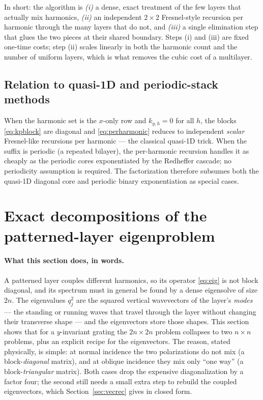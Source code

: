 \documentclass[11pt]{article}
\theoremstyle{remark}
\begin{document}
In short: the algorithm is \emph{(i)} a dense, exact treatment of the few
layers that actually mix harmonics, \emph{(ii)} an independent $2\times2$
Fresnel-style recursion per harmonic through the many layers that do not, and
\emph{(iii)} a single elimination step that glues the two pieces at their
shared boundary.  Steps (i) and (iii) are fixed one-time costs; step (ii)
scales linearly in both the harmonic count and the number of uniform layers,
which is what removes the cubic cost of a multilayer.

\subsection{Relation to quasi-1D and periodic-stack methods}

When the harmonic set is the $x$-only row and $k_{y,h}=0$ for all $h$, the
blocks \eqref{eq:kpblock} are diagonal and \eqref{eq:perharmonic} reduces to
independent \emph{scalar} Fresnel-like recursions per harmonic --- the classical
quasi-1D trick. When the suffix is periodic (a repeated bilayer), the
per-harmonic recursion handles it as cheaply as the periodic cores
exponentiated by the Redheffer cascade; no periodicity assumption is required.
The factorization therefore subsumes both the quasi-1D diagonal core and
periodic binary exponentiation as special cases.

\section{Exact decompositions of the patterned-layer eigenproblem}
\label{sec:eig}

\paragraph{What this section does, in words.}
A patterned layer couples different harmonics, so its operator
\eqref{eq:eig} is not block diagonal, and its spectrum must in general be found
by a dense eigensolve of size $2n$.  The eigenvalues $q_j^2$ are the squared
vertical wavevectors of the layer's \emph{modes} --- the standing or running
waves that travel through the layer without changing their transverse shape ---
and the eigenvectors store those shapes.  This section shows that for a
$y$-invariant grating the $2n\times2n$ problem collapses to two $n\times n$
problems, plus an explicit recipe for the eigenvectors.  The reason, stated
physically, is simple: at normal incidence the two polarizations do not mix
(a block-\emph{diagonal} matrix), and at oblique incidence they mix only
``one way'' (a block-\emph{triangular} matrix).  Both cases drop the expensive
diagonalization by a factor four; the second still needs a small extra step to
rebuild the coupled eigenvectors, which Section~\ref{sec:vecrec} gives in
closed form.
\end{document}
